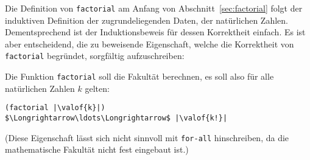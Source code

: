 Die Definition von \lstinline{factorial} am Anfang von
Abschnitt~\ref{sec:factorial} folgt der induktiven Definition der
zugrundeliegenden Daten, der natürlichen Zahlen.  Dementsprechend ist
der Induktionsbeweis für dessen Korrektheit einfach.  Es ist aber
entscheidend, die zu beweisende Eigenschaft, welche die Korrektheit
von \lstinline{factorial} begründet, sorgfältig aufzuschreiben:

Die Funktion \lstinline{factorial} soll die Fakultät berechnen, es soll
also für alle natürlichen Zahlen $k$ gelten:
%
\begin{lstlisting}
(factorial |\valof{k}|)
$\Longrightarrow\ldots\Longrightarrow$ |\valof{k!}|
\end{lstlisting}
%
(Diese Eigenschaft lässt sich nicht sinnvoll mit \lstinline{for-all}
hinschreiben, da die mathematische Fakultät nicht fest eingebaut ist.)

